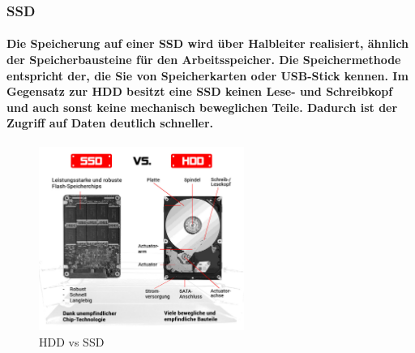 \documentclass[a4paper]{article}
\begin{document}
    \subsubsection{\color{codegreen}SSD}
    \paragraph{\color{codegreen}Die Speicherung auf einer SSD wird über Halbleiter realisiert, ähnlich der Speicherbausteine für den Arbeitsspeicher. Die Speichermethode entspricht der, die Sie von Speicherkarten oder USB-Stick kennen. Im Gegensatz zur HDD besitzt eine SSD keinen Lese- und Schreibkopf und auch sonst keine mechanisch beweglichen Teile. Dadurch ist der Zugriff auf Daten deutlich schneller.}

    \begin{center}
        \begin{figure}[H]
            \centering
            \includegraphics[height=6cm]{media/hddsdd}
            \captionsetup{labelformat=empty}
            \caption{HDD vs SSD}
            \label{fig:hddsdd}
        \end{figure}
    \end{center}
\end{document}
